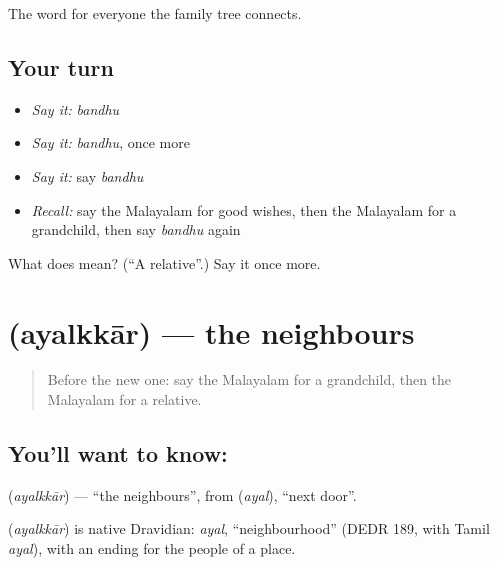 \begin{grammarlens}[title={What you've built}]
The word for everyone the family tree connects.
\end{grammarlens}

\subsection*{Your turn}
\begin{itemize}
\raggedright
  \item \emph{Say it:} \emph{bandhu}
  \item \emph{Say it:} \emph{bandhu}, once more
  \item \emph{Say it:} say \emph{bandhu}
  \item \emph{Recall:} say the Malayalam for good wishes, then the Malayalam for a grandchild, then say \emph{bandhu} again
\end{itemize}

\begin{tcolorbox}[breakable,colback=teal!4,colframe=teal!35!black,title={Before you move on}]
What does  mean? (\textquotedblleft{}A relative\textquotedblright{}.) Say it once more.
\end{tcolorbox}
\section[\texorpdfstring{\ml{അയൽക്കാർ} (ayalkkār)}{അയൽക്കാർ (ayalkkār)}]{ (ayalkkār) — the neighbours}

\label{lesson:ML-C125-neighbours}



\begin{quote}
Before the new one: say the Malayalam for a grandchild, then the Malayalam for a relative.
\end{quote}

\subsection*{You'll want to know: }
\textbf{} (\emph{ayalkkār}) — \textquotedblleft{}the neighbours\textquotedblright{}, from \textbf{} (\emph{ayal}), \textquotedblleft{}next door\textquotedblright{}.

\begin{cousinweb}
\textbf{} (\emph{ayalkkār}) is native Dravidian: \emph{ayal}, \textquotedblleft{}neighbourhood\textquotedblright{} (DEDR 189, with Tamil \emph{ayal}), with an ending for the people of a place.
\end{cousinweb}

